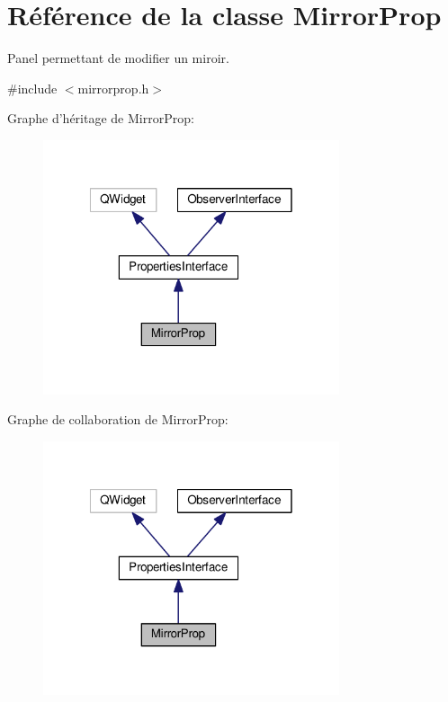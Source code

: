 \hypertarget{classMirrorProp}{\section{Référence de la classe Mirror\+Prop}
\label{classMirrorProp}
}


Panel permettant de modifier un miroir.  




{\ttfamily \#include $<$mirrorprop.\+h$>$}



Graphe d'héritage de Mirror\+Prop\+:\nopagebreak
\begin{figure}[H]
\begin{center}
\leavevmode
\includegraphics[width=247pt]{dc/d36/classMirrorProp__inherit__graph}
\end{center}
\end{figure}


Graphe de collaboration de Mirror\+Prop\+:\nopagebreak
\begin{figure}[H]
\begin{center}
\leavevmode
\includegraphics[width=247pt]{d3/d3c/classMirrorProp__coll__graph}
\end{center}
\end{figure}
